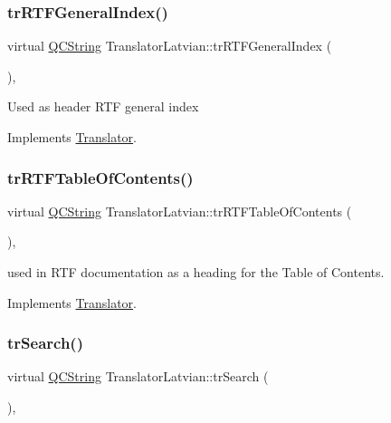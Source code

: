 \mbox{\label{class_translator_latvian_a233385f80402b364f7f89bd217ee2b43}} 
\subsubsection{\texorpdfstring{trRTFGeneralIndex()}{trRTFGeneralIndex()}}
{\footnotesize\ttfamily virtual \mbox{\hyperlink{class_q_c_string}{Q\+C\+String}} Translator\+Latvian\+::tr\+R\+T\+F\+General\+Index (\begin{DoxyParamCaption}{ }\end{DoxyParamCaption})\hspace{0.3cm}{\ttfamily [inline]}, {\ttfamily [virtual]}}

Used as header R\+TF general index 

Implements \mbox{\hyperlink{class_translator}{Translator}}.

\mbox{\label{class_translator_latvian_ab3563e94c62d7b52691a8ea260e2c901}} 
\subsubsection{\texorpdfstring{trRTFTableOfContents()}{trRTFTableOfContents()}}
{\footnotesize\ttfamily virtual \mbox{\hyperlink{class_q_c_string}{Q\+C\+String}} Translator\+Latvian\+::tr\+R\+T\+F\+Table\+Of\+Contents (\begin{DoxyParamCaption}{ }\end{DoxyParamCaption})\hspace{0.3cm}{\ttfamily [inline]}, {\ttfamily [virtual]}}

used in R\+TF documentation as a heading for the Table of Contents. 

Implements \mbox{\hyperlink{class_translator}{Translator}}.

\mbox{\label{class_translator_latvian_a372a7f6b342d6f6f362c531c3aa6beaa}} 
\subsubsection{\texorpdfstring{trSearch()}{trSearch()}}
{\footnotesize\ttfamily virtual \mbox{\hyperlink{class_q_c_string}{Q\+C\+String}} Translator\+Latvian\+::tr\+Search (\begin{DoxyParamCaption}{ }\end{DoxyParamCaption})\hspace{0.3cm}{\ttfamily [inline]}, {\ttfamily [virtual]}}

